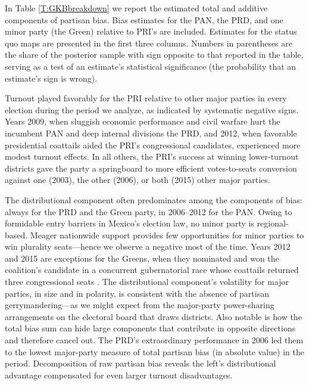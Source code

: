 \documentclass[letter,12pt]{article}
\begin{document}
{In Table \ref{T:GKBbreakdown} we report the estimated total and additive components of partisan bias. Bias estimates for the PAN, the PRD, and one minor party (the Green) relative to PRI's are included. Estimates for the status quo maps are presented in the first three columns. Numbers in parentheses are the share of the posterior sample with sign opposite to that reported in the table, serving as a test of an estimate's statistical significance (the probability that an estimate's sign is wrong). 

Turnout played favorably for the PRI relative to other major parties in every election during the period we analyze, as indicated by systematic negative signs. Years 2009, when sluggish economic performance and civil warfare hurt the incumbent PAN and deep internal divisions the PRD, and 2012, when favorable presidential coattails aided the PRI's congressional candidates, experienced more modest turnout effects. In all others, the PRI's success at winning lower-turnout districts gave the party a springboard to more efficient votes-to-seats conversion against one (2003), the other (2006), or both (2015) other major parties. 

The distributional component often predominates among the components of bias: always for the PRD and the Green party, in 2006--2012 for the PAN. Owing to formidable entry barriers in Mexico's election law, no minor party is regional-based. Meager nationwide support provides few opportunities for minor parties to win plurality seats---hence we observe a negative most of the time. Years 2012 and 2015 are exceptions for the Greens, when they nominated and won the coalition's candidate in a concurrent gubernatorial race whose coattails returned three congressional seats \citep{magar.gubCoatMx.2012}. The distributional component's volatility for major parties, in size and in polarity, is consistent with the absence of partisan gerrymandering---as we might expect from the major-party power-sharing arrangements on the electoral board that draws districts. Also notable is how the total bias sum can hide large components that contribute in opposite directions and therefore cancel out. The PRD's extraordinary performance in 2006 led them to the lowest major-party measure of total partisan bias (in absolute value) in the period. Decomposition of raw partisan bias reveals the left's distributional advantage compensated for even larger turnout disadvantages. 

}
\end{document}
